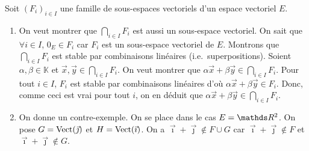 \begin{exo}
	Soit $(F_i)_{i\in I}$\/ une famille de sous-espaces vectoriels d'un espace vectoriel $E$.
	\begin{enumerate}
		\item On veut montrer que $\bigcap_{i \in  I} F_i$\/ est aussi un sous-espace vectoriel.
			On sait que $\forall i \in I$, $0_E \in F_i$\/ car $F_i$\/ est un sous-espace vectoriel de $E$.
			Montrons que $\bigcap_{i \in  I} F_i$\/ est stable par combinaisons linéaires (i.e.\ superpositions).
			Soient $\alpha, \beta \in \mathds{K}$ et $\vec{x}, \vec{y} \in \bigcap_{i \in  I} F_i$. On veut montrer que $\alpha \vec{x} + \beta \vec{y} \in \bigcap_{i \in  I} F_i$. Pour tout $i \in I$, $F_i$\/ est stable par combinaisons linéaires d'où $\alpha \vec{x} + \beta \vec{y} \in F_i$. Donc, comme ceci est vrai pour tout $i$, on en déduit que $\alpha \vec{x} + \beta \vec{y} \in \bigcap_{i \in I} F_i$.
		\item On donne un contre-exemple. On se place dans le cas $E = \R^2$. On pose $G = \operatorname{Vect}(\vec{\jmath})$\/ et $H = \operatorname{Vect}(\vec{\imath})$. On a $\vec{\imath} + \vec{\jmath} \not\in F \cup G$ car $\vec{\imath} + \vec{\jmath} \not\in F$\/ et $\vec{\imath} + \vec{\jmath} \not\in G$.


\end{enumerate}
\end{exo}
